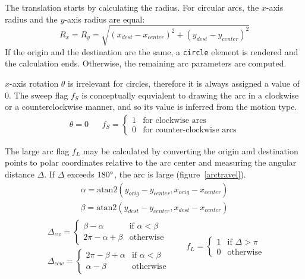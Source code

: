 The translation starts by calculating the radius. For circular arcs, the
$x$-axis radius and the $y$-axis radius are equal:
\begin{equation*}
    R_x = R_y = \sqrt{(x_{dest} - x_{center})^2 + (y_{dest} - y_{center})^2}
\end{equation*}
If the origin and the destination are the same, a \texttt{circle} element is
rendered and the calculation ends. Otherwise, the remaining arc parameters are
computed.

$x$-axis rotation $\theta$ is irrelevant for circles, therefore it is always
assigned a value of $0$. The sweep flag $f_S$ is conceptually equvialent to
drawing the arc in a clockwise or a counter\-clockwise manner, and so its value
is inferred from the motion type.
\begin{align*}
    \theta = 0 &&
    f_S = \begin{cases}
        1 & \text{for clockwise arcs} \\
        0 & \text{for counter-clockwise arcs}
    \end{cases}
\end{align*}

The large arc flag $f_L$ may be calculated by converting the origin and
destination points to polar coordinates relative to the arc center and measuring
the angular distance $\Delta$. If $\Delta$ exceeds $180\degree$, the arc is
large (figure~\ref{arctravel}).
\begin{gather*}
    \alpha = \text{atan2}(y_{orig} - y_{center}, x_{orig} - x_{center}) \\
    \beta = \text{atan2}(y_{dest} - y_{center}, x_{dest} - x_{center})
\end{gather*}
\begin{align*}
    \begin{aligned}
        \Delta_{cw} = \begin{cases}
            \beta - \alpha & \text{if } \alpha < \beta \\
            2\pi - \alpha + \beta & \text{otherwise}
        \end{cases} \\
        \Delta_{ccw} = \begin{cases}
            2\pi - \beta + \alpha & \text{if } \alpha < \beta \\
            \alpha - \beta & \text{otherwise}
        \end{cases}
    \end{aligned}
    &&
    f_L = \begin{cases}
        1 & \text{if } \Delta > \pi \\
        0 & \text{otherwise}
    \end{cases}
\end{align*}

